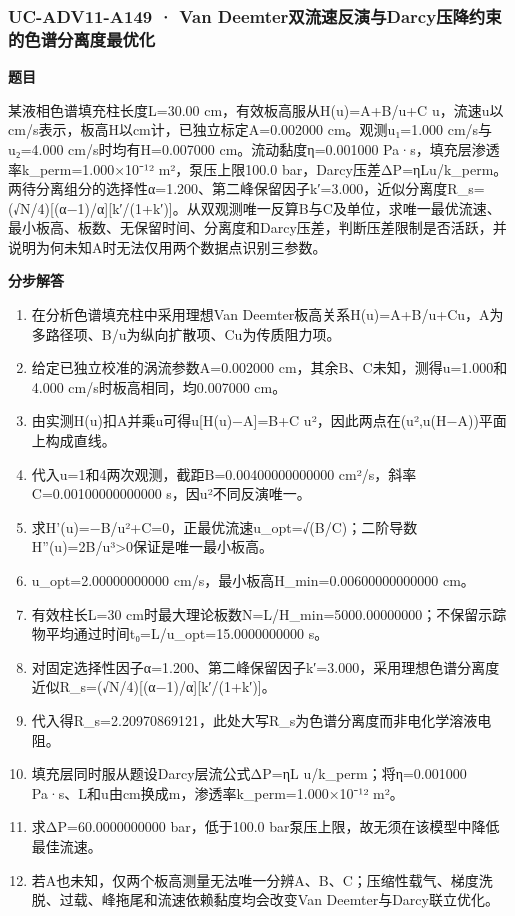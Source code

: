\documentclass[UTF8,11pt,a4paper]{ctexart}
\begin{document}
\subsubsection*{UC-ADV11-A149 · Van Deemter双流速反演与Darcy压降约束的色谱分离度最优化}
\noindent\textbf{题目}\par
某液相色谱填充柱长度L=30.00 cm，有效板高服从H(u)=A+B/u+C u，流速u以cm/s表示，板高H以cm计，已独立标定A=0.002000 cm。观测u₁=1.000 cm/s与u₂=4.000 cm/s时均有H=0.007000 cm。流动黏度η=0.001000 Pa·s，填充层渗透率k\_perm=1.000×10⁻¹² m²，泵压上限100.0 bar，Darcy压差ΔP=ηLu/k\_perm。两待分离组分的选择性α=1.200、第二峰保留因子k′=3.000，近似分离度R\_s=(√N/4)[(α−1)/α][k′/(1+k′)]。从双观测唯一反算B与C及单位，求唯一最优流速、最小板高、板数、无保留时间、分离度和Darcy压差，判断压差限制是否活跃，并说明为何未知A时无法仅用两个数据点识别三参数。\par
\medskip\noindent\textbf{分步解答}
\begin{enumerate}
\item 在分析色谱填充柱中采用理想Van Deemter板高关系H(u)=A+B/u+Cu，A为多路径项、B/u为纵向扩散项、Cu为传质阻力项。
\item 给定已独立校准的涡流参数A=0.002000 cm，其余B、C未知，测得u=1.000和4.000 cm/s时板高相同，均0.007000 cm。
\item 由实测H(u)扣A并乘u可得u[H(u)−A]=B+C u²，因此两点在(u²,u(H−A))平面上构成直线。
\item 代入u=1和4两次观测，截距B=0.00400000000000 cm²/s，斜率C=0.00100000000000 s，因u²不同反演唯一。
\item 求H'(u)=−B/u²+C=0，正最优流速u\_opt=√(B/C)；二阶导数H''(u)=2B/u³>0保证是唯一最小板高。
\item u\_opt=2.00000000000 cm/s，最小板高H\_min=0.00600000000000 cm。
\item 有效柱长L=30 cm时最大理论板数N=L/H\_min=5000.00000000；不保留示踪物平均通过时间t₀=L/u\_opt=15.0000000000 s。
\item 对固定选择性因子α=1.200、第二峰保留因子k′=3.000，采用理想色谱分离度近似R\_s=(√N/4)[(α−1)/α][k′/(1+k′)]。
\item 代入得R\_s=2.20970869121，此处大写R\_s为色谱分离度而非电化学溶液电阻。
\item 填充层同时服从题设Darcy层流公式ΔP=ηL u/k\_perm；将η=0.001000 Pa·s、L和u由cm换成m，渗透率k\_perm=1.000×10⁻¹² m²。
\item 求ΔP=60.0000000000 bar，低于100.0 bar泵压上限，故无须在该模型中降低最佳流速。
\item 若A也未知，仅两个板高测量无法唯一分辨A、B、C；压缩性载气、梯度洗脱、过载、峰拖尾和流速依赖黏度均会改变Van Deemter与Darcy联立优化。
\end{enumerate}
\end{document}
